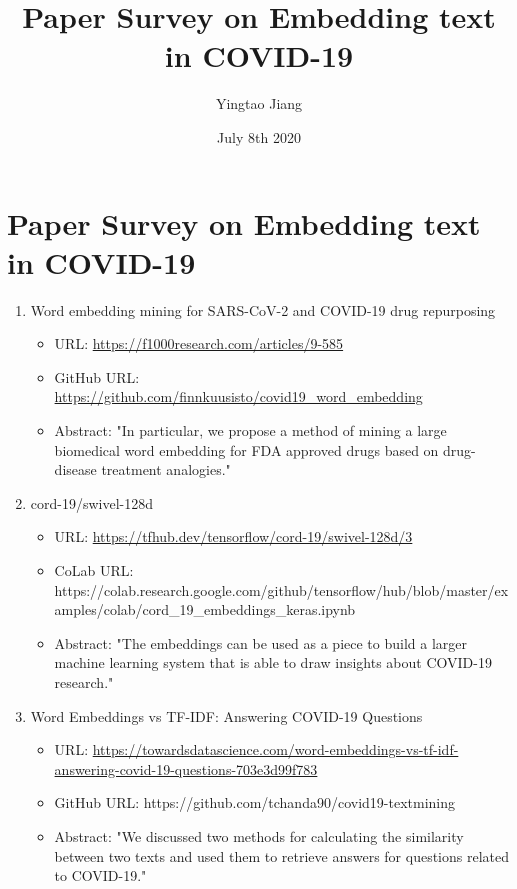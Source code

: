 \documentclass{article}
\title{Paper Survey on Embedding text in COVID-19}
\author{Yingtao Jiang}
\date{July 8th 2020}
\begin{document}
\maketitle
\section{Paper Survey on Embedding text in COVID-19}
\begin{enumerate}
  \item Word embedding mining for SARS-CoV-2 and COVID-19 drug repurposing
    \begin{itemize}
    \item URL: \url{https://f1000research.com/articles/9-585}
    \item GitHub URL: \url{https://github.com/finnkuusisto/covid19\_word\_embedding}
    \item Abstract: "In particular, we propose a method of mining a large biomedical word embedding for FDA approved drugs based on drug-disease treatment analogies."
    \end{itemize}\textbf{}
  \item cord-19/swivel-128d
     \begin{itemize}
     \item URL: \url{https://tfhub.dev/tensorflow/cord-19/swivel-128d/3}
     \item CoLab URL: https://colab.research.google.com/github/tensorflow/hub/blob/master/examples/colab/cord\_19\_embeddings\_keras.ipynb
     \item Abstract: "The embeddings can be used as a piece to build a larger machine learning system that is able to draw insights about COVID-19 research."
     \end{itemize}\textbf{}
  \item Word Embeddings vs TF-IDF: Answering COVID-19 Questions
     \begin{itemize}
     \item URL: \url{https://towardsdatascience.com/word-embeddings-vs-tf-idf-answering-covid-19-questions-703e3d99f783}
     \item GitHub URL: https://github.com/tchanda90/covid19-textmining
     \item Abstract: "We discussed two methods for calculating the similarity between two texts and used them to retrieve answers for questions related to COVID-19."
     \end{itemize}\textbf{}
\end{enumerate}\textbf{}
\end{document}
